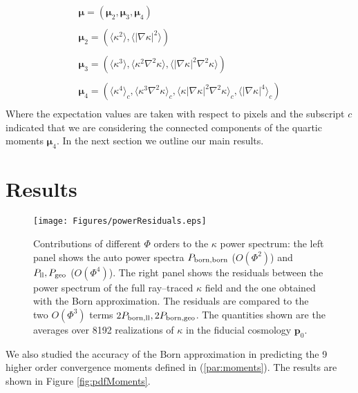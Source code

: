 \documentclass[reprint,aps,prd,superscriptaddress,showkeys,showpacs]{revtex4-1}
\newcommand{\bb}[1]{\mathbf{#1}}
\begin{document}
\begin{equation}
\label{par:moments}
\begin{matrix}
\pmb{\mu} = (\pmb{\mu}_2,\pmb{\mu}_3,\pmb{\mu}_4) \\ \\
\pmb{\mu}_2 = \left(\langle\kappa^2\rangle,\langle\vert\nabla\kappa\vert^2\rangle\right) \\ \\
\pmb{\mu}_3 = \left(\langle\kappa^3\rangle,\langle\kappa^2\nabla^2\kappa\rangle,\langle\vert\nabla\kappa\vert^2\nabla^2\kappa\rangle\right) \\ \\
\pmb{\mu}_4 = \left(\langle\kappa^4\rangle_c,\langle\kappa^3\nabla^2\kappa\rangle_c,\langle\kappa\vert\nabla\kappa\vert^2\nabla^2\kappa\rangle_c,\langle\vert\nabla\kappa\vert^4\rangle_c\right) \\
\end{matrix}
\end{equation} 
%
Where the expectation values are taken with respect to pixels and the subscript $c$ indicated that we are considering the connected components of the quartic moments $\pmb{\mu}_4$. In the next section we outline our main results.  


\section{Results}
% 
\begin{figure*}
\begin{center}
\texttt{[image: Figures/powerResiduals.eps]}
\end{center}
\caption{Contributions of different $\Phi$ orders to the $\kappa$ power spectrum: the left panel shows the auto power spectra $P_{\rm born,born}$ ($O(\Phi^2)$) and $P_{\rm ll},P_{\rm geo}$ ($O(\Phi^4)$). The right panel shows the residuals between the power spectrum of the full ray--traced $\kappa$ field and the one obtained with the Born approximation. The residuals are compared to the two $O(\Phi^3)$ terms $2P_{\rm born,ll},2P_{\rm born,geo}$. The quantities shown are the averages over 8192 realizations of $\kappa$ in the fiducial cosmology $\bb{p}_0$.}
\label{fig:psResiduals}
\end{figure*}
%
We also studied the accuracy of the Born approximation in predicting the 9 higher order convergence moments defined in (\ref{par:moments}). The results are shown in Figure \ref{fig:pdfMoments}. 
\end{document}
